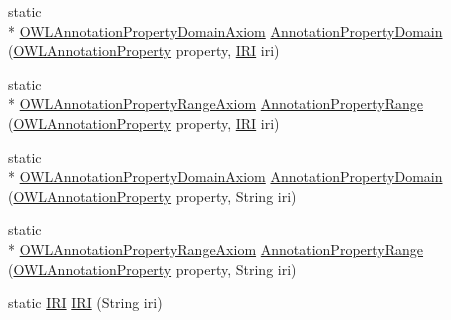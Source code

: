 \begin{DoxyCompactItemize}
\item 
static \\*
\hyperlink{interfaceorg_1_1semanticweb_1_1owlapi_1_1model_1_1_o_w_l_annotation_property_domain_axiom}{O\-W\-L\-Annotation\-Property\-Domain\-Axiom} \hyperlink{classorg_1_1semanticweb_1_1owlapi_1_1apibinding_1_1_o_w_l_functional_syntax_factory_a5ba1cce2c59323616134666cdb631b7e}{Annotation\-Property\-Domain} (\hyperlink{interfaceorg_1_1semanticweb_1_1owlapi_1_1model_1_1_o_w_l_annotation_property}{O\-W\-L\-Annotation\-Property} property, \hyperlink{classorg_1_1semanticweb_1_1owlapi_1_1model_1_1_i_r_i}{I\-R\-I} iri)
\item 
static \\*
\hyperlink{interfaceorg_1_1semanticweb_1_1owlapi_1_1model_1_1_o_w_l_annotation_property_range_axiom}{O\-W\-L\-Annotation\-Property\-Range\-Axiom} \hyperlink{classorg_1_1semanticweb_1_1owlapi_1_1apibinding_1_1_o_w_l_functional_syntax_factory_af50eb6d07d1d37778d40d85afc4a0ce8}{Annotation\-Property\-Range} (\hyperlink{interfaceorg_1_1semanticweb_1_1owlapi_1_1model_1_1_o_w_l_annotation_property}{O\-W\-L\-Annotation\-Property} property, \hyperlink{classorg_1_1semanticweb_1_1owlapi_1_1model_1_1_i_r_i}{I\-R\-I} iri)
\item 
static \\*
\hyperlink{interfaceorg_1_1semanticweb_1_1owlapi_1_1model_1_1_o_w_l_annotation_property_domain_axiom}{O\-W\-L\-Annotation\-Property\-Domain\-Axiom} \hyperlink{classorg_1_1semanticweb_1_1owlapi_1_1apibinding_1_1_o_w_l_functional_syntax_factory_a8cfa6a72a2bb25cc13d78be1be335434}{Annotation\-Property\-Domain} (\hyperlink{interfaceorg_1_1semanticweb_1_1owlapi_1_1model_1_1_o_w_l_annotation_property}{O\-W\-L\-Annotation\-Property} property, String iri)
\item 
static \\*
\hyperlink{interfaceorg_1_1semanticweb_1_1owlapi_1_1model_1_1_o_w_l_annotation_property_range_axiom}{O\-W\-L\-Annotation\-Property\-Range\-Axiom} \hyperlink{classorg_1_1semanticweb_1_1owlapi_1_1apibinding_1_1_o_w_l_functional_syntax_factory_a7c492f197a8cf3c6bb139b3283f96766}{Annotation\-Property\-Range} (\hyperlink{interfaceorg_1_1semanticweb_1_1owlapi_1_1model_1_1_o_w_l_annotation_property}{O\-W\-L\-Annotation\-Property} property, String iri)
\item 
static \hyperlink{classorg_1_1semanticweb_1_1owlapi_1_1model_1_1_i_r_i}{I\-R\-I} \hyperlink{classorg_1_1semanticweb_1_1owlapi_1_1apibinding_1_1_o_w_l_functional_syntax_factory_a7116c503ba9ae7a6209c94f3c3490c29}{I\-R\-I} (String iri)

\end{DoxyCompactItemize}
